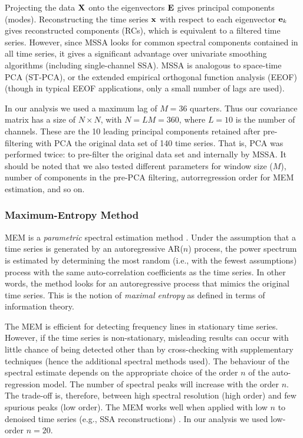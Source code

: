Projecting the data $\mathbf{X}$ onto the eigenvectors $\mathbf{E}$ gives principal components (modes). Reconstructing the time series $\mathbf{x}$ with respect to each eigenvector $\mathbf{e}_k$ gives reconstructed components (RCs), which is equivalent to a filtered time series. However, since MSSA looks for common spectral components contained in all time series, it gives a significant advantage over univariate smoothing algorithms (including single-channel SSA). MSSA is analogous to space-time PCA (ST-PCA), or the extended empirical orthogonal function analysis (EEOF) (though in typical EEOF applications, only a small number of lags are used).

In our analysis we used a maximum lag of $M = 36$ quarters. Thus our covariance matrix has a size of $N \times N$, with $N = LM = 360$, where $L = 10$ is the number of channels. These are the 10 leading principal components retained after pre-filtering with PCA the original data set of 140 time series. That is, PCA was performed twice: to pre-filter the original data set and internally by MSSA. It should be noted that we also tested different parameters for window size ($M$), number of components in the pre-PCA filtering, autorregression order for MEM estimation, and so on.

\subsubsection*{Maximum-Entropy Method}

MEM is a \emph{parametric} spectral estimation method \parencite{Childers1978}. Under the assumption that a time series is generated by an autoregressive AR($n$) process, the power spectrum is estimated by determining the most random (i.e., with the fewest assumptions) process with the same auto-correlation coefficients as the time series. In other words, the method looks for an autoregressive process that mimics the original time series. This is the notion of \emph{maximal entropy} as defined in terms of information theory.

The MEM is efficient for detecting frequency lines in stationary time series. However, if the time series is non-stationary, misleading results can occur with little chance of being detected other than by cross-checking with supplementary techniques (hence the additional spectral methods used). The behaviour of the spectral estimate depends on the appropriate choice of the order $n$ of the auto-regression model. The number of spectral peaks will increase with the order $n$. The trade-off is, therefore, between high spectral resolution (high order) and few spurious peaks (low order). The MEM works well when applied with low $n$ to denoised time series (e.g., SSA reconstructions) \parencite{Penland1991}. In our analysis we used low-order $n=20$.

